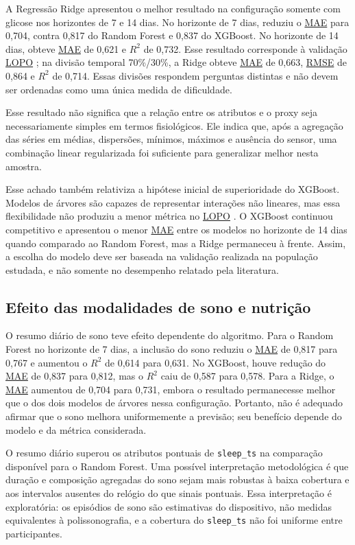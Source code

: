 \documentclass[12pt,a4paper]{article}
\DeclareRobustCommand{\sigla}[1]{%
    \texorpdfstring{\hyperlink{sigla:#1}{#1}}{#1}%
}
\begin{document}
A Regressão Ridge apresentou o melhor resultado na configuração somente com
glicose nos horizontes de 7 e 14 dias. No horizonte de 7 dias, reduziu o
\sigla{MAE} para 0,704, contra 0,817 do Random Forest e 0,837 do XGBoost. No
horizonte de 14 dias, obteve \sigla{MAE} de 0,621 e $R^2$ de 0,732. Esse
resultado corresponde à validação \sigla{LOPO}; na divisão temporal
70\%/30\%, a Ridge obteve \sigla{MAE} de 0,663, \sigla{RMSE} de 0,864 e
$R^2$ de 0,714. Essas divisões respondem perguntas distintas e não devem ser
ordenadas como uma única medida de dificuldade.

Esse resultado não significa que a relação entre os atributos e o proxy seja
necessariamente simples em termos fisiológicos. Ele indica que, após a
agregação das séries em médias, dispersões, mínimos, máximos e ausência do
sensor, uma combinação linear regularizada foi suficiente para generalizar
melhor nesta amostra.

Esse achado também relativiza a hipótese inicial de superioridade do XGBoost.
Modelos de árvores são capazes de representar interações não lineares, mas
essa flexibilidade não produziu a menor métrica no \sigla{LOPO}. O XGBoost
continuou competitivo e apresentou o menor \sigla{MAE} entre os modelos no
horizonte de 14 dias quando comparado ao Random Forest, mas a Ridge permaneceu
à frente. Assim, a escolha do modelo deve ser baseada na validação realizada
na população estudada, e não somente no desempenho relatado pela literatura.

\subsection{Efeito das modalidades de sono e nutrição}

O resumo diário de sono teve efeito dependente do algoritmo. Para o Random
Forest no horizonte de 7 dias, a inclusão do sono reduziu o \sigla{MAE} de
0,817 para 0,767 e aumentou o $R^2$ de 0,614 para 0,631. No XGBoost, houve
redução do \sigla{MAE} de 0,837 para 0,812, mas o $R^2$ caiu de 0,587 para
0,578. Para a Ridge, o \sigla{MAE} aumentou de 0,704 para 0,731, embora o
resultado permanecesse melhor que o dos dois modelos de árvores nessa
configuração. Portanto, não é adequado afirmar que o sono melhora
uniformemente a previsão; seu benefício depende do modelo e da métrica
considerada.

O resumo diário superou os atributos pontuais de \texttt{sleep\_ts} na
comparação disponível para o Random Forest. Uma possível interpretação
metodológica é que duração e composição agregadas do sono sejam mais robustas
à baixa cobertura e aos intervalos ausentes do relógio do que sinais pontuais.
Essa interpretação é exploratória: os episódios de sono são estimativas do
dispositivo, não medidas equivalentes à polissonografia, e a cobertura do
\texttt{sleep\_ts} não foi uniforme entre participantes.
\end{document}
